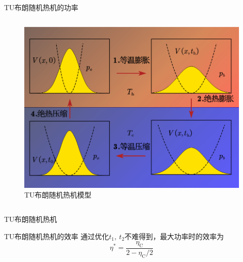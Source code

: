 \documentclass{beamer}
\begin{document}
\begin{frame}{TU布朗随机热机的功率}
\begin{columns}
        \begin{column}{.38\textwidth}
            \onslide
            \begin{figure}
                \begin{center}
                    \includegraphics[width=\textwidth]{p2.png}
                \end{center}
                \setcounter{figure}{1}
                \caption{TU布朗随机热机模型}
            \end{figure}
        \end{column}
    \end{columns}
\end{frame}

\begin{frame}{TU布朗随机热机}
\begin{alertblock}{TU布朗随机热机的效率}
通过优化$t_1,\ t_2$不难得到，最大功率时的效率为
\begin{equation}
    \eta^{*}=\frac{\eta_{\mathrm{C}}}{2-\eta_{\mathrm{C}} / 2}
    \label{eq8}
\end{equation}
\end{alertblock}
\end{frame}
\end{document}
